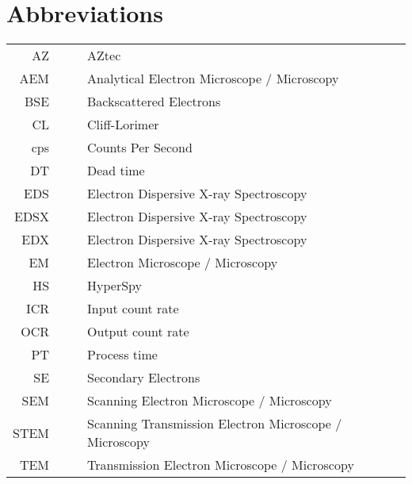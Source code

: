 \chapter*{Abbreviations}
\label{ch:Abbreviations}

\begin{table}[h!]
    \centering
    \begin{tabular}{rrrl}
        \hline
        AZ   &  &  & AZtec                                                  \\
        AEM  &  &  & Analytical Electron Microscope / Microscopy            \\
        BSE  &  &  & Backscattered Electrons                                \\
        CL   &  &  & Cliff-Lorimer                                          \\
        cps  &  &  & Counts Per Second                                      \\
        DT   &  &  & Dead time                                              \\
        EDS  &  &  & Electron Dispersive X-ray Spectroscopy                 \\
        EDSX &  &  & Electron Dispersive X-ray Spectroscopy                 \\
        EDX  &  &  & Electron Dispersive X-ray Spectroscopy                 \\
        EM   &  &  & Electron Microscope / Microscopy                       \\
        HS   &  &  & HyperSpy                                               \\
        ICR  &  &  & Input count rate                                       \\
        OCR  &  &  & Output count rate                                      \\
        PT   &  &  & Process time                                           \\
        SE   &  &  & Secondary Electrons                                    \\
        SEM  &  &  & Scanning Electron Microscope / Microscopy              \\
        STEM &  &  & Scanning Transmission Electron Microscope / Microscopy \\
        TEM  &  &  & Transmission Electron Microscope / Microscopy          \\
        \hline
    \end{tabular}
\end{table}

